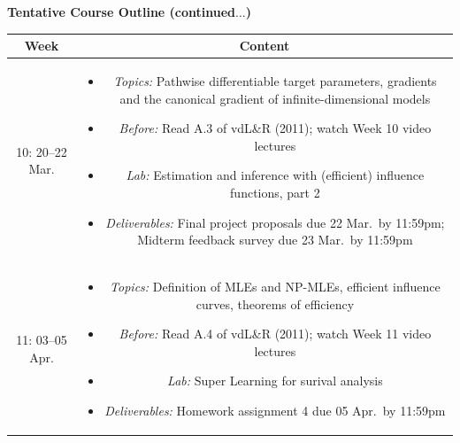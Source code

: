 \documentclass[11pt]{article}
\begin{document}
\newpage

\textbf {\large Tentative Course Outline (continued$\dots$)}

\begin{table}[H]
\normalsize %
\begin{tabular}{ | c | c | }
\hline
\textbf{Week} & \textbf{Content} \\
\hline

10: 20--22 Mar. & \begin{minipage}{.85\textwidth}
\begin{itemize} \itemsep-0.4em
  \vspace{1mm}
  \item \textit{Topics:} Pathwise differentiable target parameters, gradients
    and the canonical gradient of infinite-dimensional models
  \item \textit{Before:} Read A.3 of vdL\&R (2011); watch Week 10 video
    lectures
  \item \textit{Lab:} Estimation and inference with (efficient) influence
    functions, part 2
  \item \textit{Deliverables:} Final project proposals due 22 Mar.~by 11:59pm;
    Midterm feedback survey due 23 Mar.~by 11:59pm
  \vspace{1mm}
\end{itemize}
\end{minipage} \\
\hline

11: 03--05 Apr. & \begin{minipage}{.85\textwidth}
\begin{itemize} \itemsep-0.4em
  \vspace{1mm}
  \item \textit{Topics:} Definition of MLEs and NP-MLEs, efficient influence
    curves, theorems of efficiency
  \item \textit{Before:} Read A.4 of vdL\&R (2011); watch Week 11 video
    lectures
  \item \textit{Lab:} Super Learning for surival analysis
  \item \textit{Deliverables:} Homework assignment 4 due 05 Apr.~by 11:59pm
  \vspace{1mm}
\end{itemize}
\end{minipage} \\
\hline


\end{tabular}
\end{table}
\end{document}
